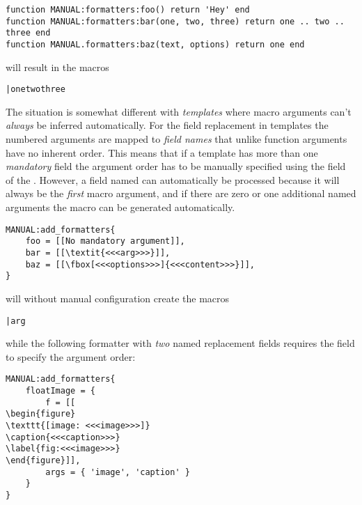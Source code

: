 \documentclass[12pt]{scrartcl}
\begin{document}
\begin{verbatim}
function MANUAL:formatters:foo() return 'Hey' end
function MANUAL:formatters:bar(one, two, three) return one .. two .. three end
function MANUAL.formatters:baz(text, options) return one end
\end{verbatim}

\noindent will result in the macros

\begin{itemize*}
\item \texttt{\foo}
\item \texttt{\bar{one}{two}{three}}
\item \texttt{}
\end{itemize*}

\noindent The situation is somewhat different with \emph{templates} where macro
arguments can't \emph{always} be inferred automatically.  For the field
replacement in templates the numbered arguments are mapped to \emph{field names}
that unlike function arguments have no inherent order.  This means that if a
template has more than one \emph{mandatory} field the argument order has to be
manually specified using the  field of the .  However, a field named  can automatically be
processed because it will always be the \emph{first} macro argument, and if
there are zero or one additional named arguments the macro can be generated
automatically.

\begin{verbatim}
MANUAL:add_formatters{
	foo = [[No mandatory argument]],
	bar = [[\textit{<<<arg>>>}]],
	baz = [[\fbox[<<<options>>>]{<<<content>>>}]],
}
\end{verbatim}

\noindent will without manual configuration create the macros

\begin{itemize*}
\item \texttt{\foo}
\item \texttt{\bar{arg}}
\item \texttt{}
\end{itemize*}

\noindent while the following formatter with \emph{two} named replacement fields requires the  field to specify the argument order:

\begin{verbatim}
MANUAL:add_formatters{
	floatImage = {
		f = [[
\begin{figure}
\texttt{[image: <<<image>>>]}
\caption{<<<caption>>>}
\label{fig:<<<image>>>}
\end{figure}]],
		args = { 'image', 'caption' }
	}
}
\end{verbatim}
\end{document}
